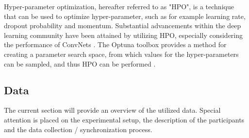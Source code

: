 \documentclass[12pt]{article}
\begin{document}
Hyper-parameter optimization, hereafter referred to as "HPO", is a technique that can be used to optimize hyper-parameter, such as for example learning rate, dropout probability and momentum. Substantial advancements within the deep learning community have been attained by utilizing HPO, especially considering the performance of ConvNets \cite{bergstra2012random}. The Optuna toolbox provides a method for creating a parameter search space, from which values for the hyper-parameters can be sampled, and thus HPO can be performed \cite{akiba2019optuna}. 

\subsection{Data}
The current section will provide an overview of the utilized data. Special attention is placed on the experimental setup, the description of the participants and the data collection / synchronization process. 
\end{document}
